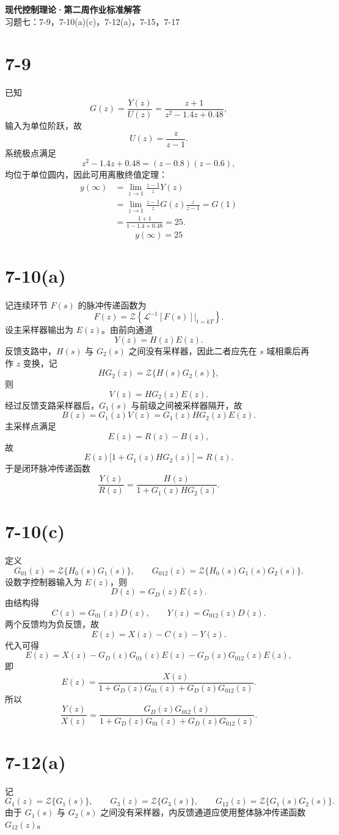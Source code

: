 \documentclass[UTF8,a4paper,11pt]{ctexart}
\begin{document}
\begin{center}
{\LARGE\bfseries 现代控制理论·第二周作业标准解答}\\[4pt]
{\large 习题七：7-9，7-10(a)(c)，7-12(a)，7-15，7-17}
\end{center}

\section*{7-9}
已知
\[
G(z)=\frac{Y(z)}{U(z)}=\frac{z+1}{z^2-1.4z+0.48},
\]
输入为单位阶跃，故
\[
U(z)=\frac{z}{z-1}.
\]
系统极点满足
\[
z^2-1.4z+0.48=(z-0.8)(z-0.6),
\]
均位于单位圆内，因此可用离散终值定理：
\[
\begin{aligned}
y(\infty)
&=\lim_{z\to1}\frac{z-1}{z}Y(z)\\
&=\lim_{z\to1}\frac{z-1}{z}G(z)\frac{z}{z-1}
=G(1)\\
&=\frac{1+1}{1-1.4+0.48}=25.
\end{aligned}
\]
\[
\boxed{y(\infty)=25}
\]

\section*{7-10(a)}
记连续环节 $F(s)$ 的脉冲传递函数为
\[
F(z)=\mathcal Z\left\{\mathcal L^{-1}[F(s)]\big|_{t=kT}\right\}.
\]
设主采样器输出为 $E(z)$。由前向通道
\[
Y(z)=H(z)E(z).
\]
反馈支路中，$H(s)$ 与 $G_2(s)$ 之间没有采样器，因此二者应先在 $s$ 域相乘后再作 $z$ 变换，记
\[
HG_2(z)=\mathcal Z\{H(s)G_2(s)\},
\]
则
\[
V(z)=HG_2(z)E(z).
\]
经过反馈支路采样器后，$G_1(s)$ 与前级之间被采样器隔开，故
\[
B(z)=G_1(z)V(z)=G_1(z)HG_2(z)E(z).
\]
主采样点满足
\[
E(z)=R(z)-B(z),
\]
故
\[
E(z)\big[1+G_1(z)HG_2(z)\big]=R(z).
\]
于是闭环脉冲传递函数
\[
\boxed{\frac{Y(z)}{R(z)}
=\frac{H(z)}{1+G_1(z)HG_2(z)}}.
\]

\section*{7-10(c)}
定义
\[
G_{01}(z)=\mathcal Z\{H_0(s)G_1(s)\},\qquad
G_{012}(z)=\mathcal Z\{H_0(s)G_1(s)G_2(s)\}.
\]
设数字控制器输入为 $E(z)$，则
\[
D(z)=G_D(z)E(z).
\]
由结构得
\[
C(z)=G_{01}(z)D(z),\qquad
Y(z)=G_{012}(z)D(z).
\]
两个反馈均为负反馈，故
\[
E(z)=X(z)-C(z)-Y(z).
\]
代入可得
\[
E(z)=X(z)-G_D(z)G_{01}(z)E(z)-G_D(z)G_{012}(z)E(z),
\]
即
\[
E(z)=\frac{X(z)}
{1+G_D(z)G_{01}(z)+G_D(z)G_{012}(z)}.
\]
所以
\[
\boxed{
\frac{Y(z)}{X(z)}
=
\frac{G_D(z)G_{012}(z)}
{1+G_D(z)G_{01}(z)+G_D(z)G_{012}(z)}
}.
\]

\section*{7-12(a)}
记
\[
G_1(z)=\mathcal Z\{G_1(s)\},\qquad
G_3(z)=\mathcal Z\{G_3(s)\},\qquad
G_{12}(z)=\mathcal Z\{G_1(s)G_2(s)\}.
\]
由于 $G_1(s)$ 与 $G_2(s)$ 之间没有采样器，内反馈通道应使用整体脉冲传递函数 $G_{12}(z)$。
\end{document}
